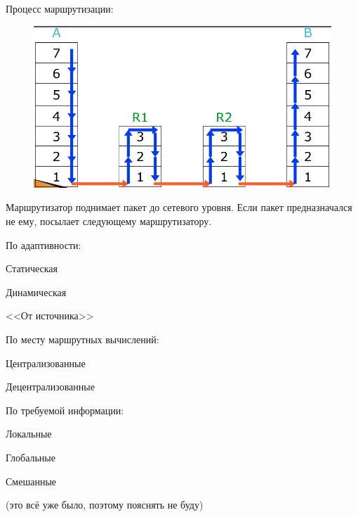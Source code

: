 Процесс маршрутизации:

\begin{figure}[H]
  \centering
  \includegraphics[width=15cm]{images/04/01}
\end{figure}

Маршрутизатор поднимает пакет до сетевого уровня. Если пакет предназначался не ему, посылает следующему маршрутизатору.


\begin{MyItemize}
    \item По адаптивности:
    \begin{MyItemize}
        \item Статическая
        \item Динамическая
        \item <<От источника>>
    \end{MyItemize}
    \item По месту маршрутных вычислений:
    \begin{MyItemize}
        \item Централизованные
        \item Децентрализованные
    \end{MyItemize}
    \item По требуемой информации:
    \begin{MyItemize}
        \item Локальные
        \item Глобальные
        \item Смешанные
    \end{MyItemize}
\end{MyItemize}

(это всё уже было, поэтому пояснять не буду)


